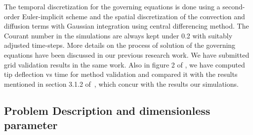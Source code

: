 \documentclass[final,3p,10pt,times,review,authoryear]{elsarticle}
\begin{document}
	
	The temporal discretization for the governing equations is done using a second-order Euler-implicit scheme and the spatial discretization of the convection and diffusion terms with Gaussian integration using central differencing method. The Courant number in the simulations are always kept under 0.2 with suitably adjusted time-steps. More details on the process of solution of the governing equations have been discussed in our previous research work\citep{Self2019}.
	We have submitted grid validation results in the same work. Also in figure 2 of \citep{Self2019}, we have computed tip deflection vs time for method validation and compared it with the results mentioned in section 3.1.2 of~\citep{Gluck2001}, which concur with the results our simulations. 
	
	
	
	\subsection{Problem Description and dimensionless parameter}
	
\end{document}
